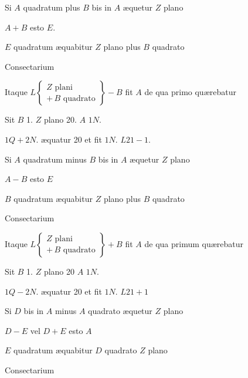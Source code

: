 \documentclass[11pt,a4paper]{article}
\begin{document}
Si $A$ quadratum plus $B$ bis in $A$ æquetur $Z$ plano

$A + B$ esto $E$.

 $E$ quadratum æquabitur $Z$ plano plus $B$ quadrato

Consectarium

Itaque $L \left\{ \begin{array}{l} Z \text{ plani} \\ +\,B \text{ quadrato} \end{array} \right\} - B$ fit $A$ de qua primo quærebatur

Sit $B$ 1. $Z$ plano 20. $A$ $1N$.

$1Q + 2N$. æquatur 20 et fit $1N$. $L21 - 1$.

Si $A$ quadratum minus $B$ bis in $A$ æquetur $Z$ plano

$A - B$ esto $E$

 \emph{$B$} quadratum æquabitur $Z$ plano plus $B$ quadrato

Consectarium

Itaque $L \left\{ \begin{array}{l} Z \text{ plani} \\ +\,B \text{ quadrato} \end{array} \right\} + B$ fit $A$ de qua primum quærebatur

Sit $B$ 1. $Z$ plano 20 $A$ $1N$.

$1Q - 2N$. æquatur 20 et fit $1N$. $L21 + 1$


Si $D$ bis in $A$ minus $A$ quadrato æquetur $Z$ plano

$D - E$ vel $D + E$ esto $A$

$E$ quadratum æquabitur $D$ quadrato   $Z$ plano

Consectarium
\end{document}

